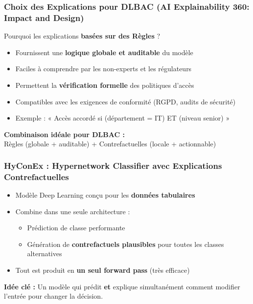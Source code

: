\documentclass{beamer}
\begin{document}
\begin{frame}
\frametitle{Choix des Explications pour DLBAC (AI Explainability 360: Impact and Design)}
\begin{block}{Pourquoi les explications \textbf{basées sur des Règles} ?}
\begin{itemize}
    \item Fournissent une \textbf{logique globale et auditable} du modèle
    \item Faciles à comprendre par les non-experts et les régulateurs
    \item Permettent la \textbf{vérification formelle} des politiques d'accès
    \item Compatibles avec les exigences de conformité (RGPD, audits de sécurité)
    \item Exemple : « Accès accordé si (département = IT) ET (niveau senior) »
\end{itemize}
\end{block}

\begin{center}
\textbf{Combinaison idéale pour DLBAC :} \\
Règles (globale + auditable) + Contrefactuelles (locale + actionnable)
\end{center}

\end{frame}

\begin{frame}
\frametitle{HyConEx : Hypernetwork Classifier avec Explications Contrefactuelles}

\begin{itemize}
    \item Modèle Deep Learning conçu pour les \textbf{données tabulaires}
    \item Combine dans une seule architecture :
    \begin{itemize}
        \item Prédiction de classe performante
        \item Génération de \textbf{contrefactuels plausibles} pour toutes les classes alternatives
    \end{itemize}
    \item Tout est produit en \textbf{un seul forward pass} (très efficace)
\end{itemize}

\begin{center}
\textbf{Idée clé :} Un modèle qui prédit \textbf{et} explique simultanément comment modifier l'entrée pour changer la décision.
\end{center}

\end{frame}
\end{document}
